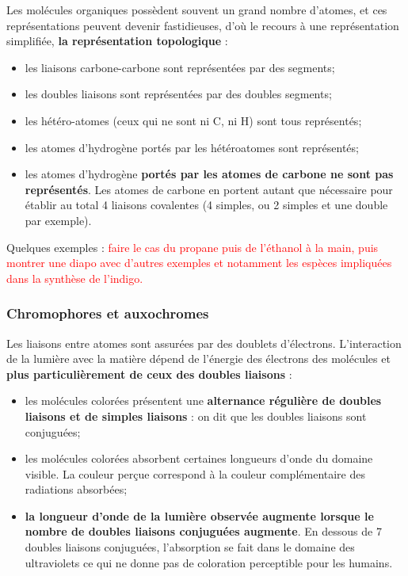 \documentclass[11pt,a4paper]{report}
\begin{document}
Les molécules organiques possèdent souvent un grand nombre d'atomes, et ces représentations peuvent devenir fastidieuses, d'où le recours à une représentation simplifiée, \textbf{la représentation topologique} :
\begin{itemize}
	\item les liaisons carbone-carbone sont représentées par des segments;
	\item les doubles liaisons sont représentées par des doubles segments;
	\item les hétéro-atomes (ceux qui ne sont ni C, ni H) sont tous représentés;
	\item les atomes d'hydrogène portés par les hétéroatomes sont représentés;
	\item les atomes d'hydrogène \textbf{portés par les atomes de carbone ne sont pas représentés}.
		Les atomes de carbone en portent autant que nécessaire pour établir au total 4 liaisons 				covalentes (4 simples, ou 2 simples et une double par exemple).
\end{itemize}

Quelques exemples : \textcolor{red}{faire le cas du propane puis de l'éthanol à la main, puis montrer une diapo avec d'autres exemples et notamment les espèces impliquées dans la synthèse de l'indigo.}

\subsubsection{Chromophores et auxochromes}

Les liaisons entre atomes sont assurées par des doublets d'électrons. L'interaction de la lumière
avec la matière dépend de l'énergie des électrons des molécules et \textbf{plus particulièrement de ceux des doubles liaisons} :
\begin{itemize}
	\item les molécules colorées présentent une \textbf{alternance régulière de doubles liaisons et de 			simples liaisons} : on dit que les doubles liaisons sont conjuguées;
	\item les molécules colorées absorbent certaines longueurs d'onde du domaine visible. La couleur
		perçue correspond à la couleur complémentaire des radiations absorbées;
	\item \textbf{la longueur d'onde de la lumière observée augmente lorsque le nombre de doubles 				liaisons conjuguées augmente}. En dessous de 7 doubles liaisons conjuguées, l'absorption se 			fait dans le domaine des ultraviolets ce qui ne donne pas de coloration perceptible pour les 			humains.
\end{itemize}
\end{document}
